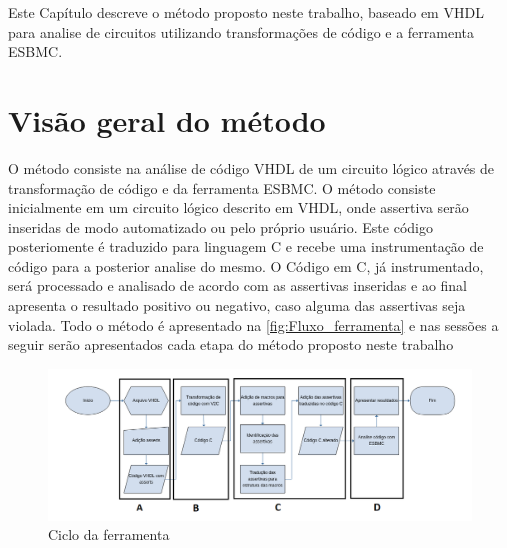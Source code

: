 \label{chapter:metodo}
Este Capítulo descreve o método proposto neste trabalho, baseado em VHDL para analise de circuitos utilizando transformações de código e a ferramenta ESBMC.

\section{Visão geral do método}
O método consiste na análise de código VHDL de um circuito lógico através de transformação de código e da ferramenta ESBMC. O método consiste inicialmente em um circuito lógico descrito em VHDL, onde assertiva serão inseridas de modo automatizado ou pelo próprio usuário. Este código posteriomente é traduzido para linguagem C e recebe uma instrumentação de código para a posterior analise do mesmo. O Código em C, já instrumentado, será processado e analisado de acordo com as assertivas inseridas e ao final apresenta o resultado positivo ou negativo, caso alguma das assertivas seja violada. Todo o método é apresentado na \autoref{fig:Fluxo_ferramenta} e nas sessões a seguir serão apresentados cada etapa do método proposto neste trabalho

\begin{figure}[H]
	\begin{center}
    \caption{\label{fig:Fluxo_ferramenta}Ciclo da ferramenta}
	\includegraphics[scale=0.5]{Figuras/Fluxo_ferramenta.png}
	\end{center}
\end{figure}

